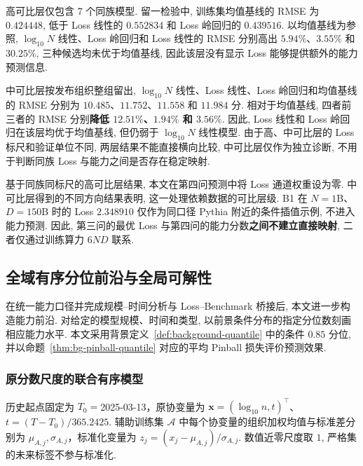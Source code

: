 高可比层仅包含 7 个同族模型. 留一检验中, 训练集均值基线的 RMSE 为 $0.424448$, 低于 Loss 线性的 $0.552834$ 和 Loss 岭回归的 $0.439516$. 以均值基线为参照, $\log_{10}N$ 线性、Loss 岭回归和 Loss 线性的 RMSE 分别高出 $5.94\%$、$3.55\%$ 和 $30.25\%$, 三种候选均未优于均值基线, 因此该层没有显示 Loss 能够提供额外的能力预测信息.

中可比层按发布组织整组留出, $\log_{10}N$ 线性、Loss 线性、Loss 岭回归和均值基线的 RMSE 分别为 $10.485$、$11.752$、$11.558$ 和 $11.984$ 分. 相对于均值基线, 四者前三者的 RMSE 分别\textbf{降低 $12.51\%$、$1.94\%$ 和 $3.56\%$}. 因此, Loss 线性和 Loss 岭回归在该层均优于均值基线, 但仍弱于 $\log_{10}N$ 线性模型. 由于高、中可比层的 Loss 标尺和验证单位不同, 两层结果不能直接横向比较, 中可比层仅作为独立诊断, 不用于判断同族 Loss 与能力之间是否存在稳定映射.

基于同族同标尺的高可比层结果, 本文在第四问预测中将 Loss 通道权重设为零. 中可比层得到的不同方向结果表明, 这一处理依赖数据的可比层级. B1 在 $N=1$B、$D=150$B 时的 Loss $2.348910$ 仅作为同口径 Pythia 附近的条件插值示例, 不进入能力预测. 因此, 第三问的最优 Loss 与第四问的能力分数\textbf{之间不建立直接映射}, 二者仅通过训练算力 $6ND$ 联系. 
\subsection{全域有序分位前沿与全局可解性}
 
在统一能力口径并完成规模--时间分析与 Loss--Benchmark 桥接后, 本文进一步构造能力前沿. 对给定的模型规模、时间和类型, 以前景条件分布的指定分位数刻画相应能力水平. 本文采用背景定义~\ref{def:background-quantile} 中的条件 $0.85$ 分位, 并以命题~\ref{thm:bg-pinball-quantile} 对应的平均 Pinball 损失评价预测效果. 

\subsubsection{原分数尺度的联合有序模型}
历史起点固定为 $T_0=$2025-03-13，原协变量为 $\boldsymbol x=(\log_{10}n,t)^\top$、$t=(T-T_0)/365.2425$. 辅助训练集 $\mathcal A$ 中每个协变量的组织加权均值与标准差分别为 $\mu_{A,j}, \sigma_{A,j}$，标准化变量为 $z_j=(x_j-\mu_{A,j})/\sigma_{A,j}$. 数值近零尺度取 $1$, 严格集的未来标签不参与标准化. 

